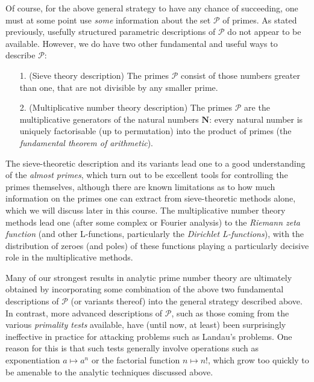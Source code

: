 \documentclass[10pt,reqno]{amsart}
\begin{document}
Of course, for the above general strategy to have any chance of succeeding, one must at some point use \emph{some} information about the set $\mathcal{P}$ of primes. As stated previously, usefully structured parametric descriptions of $\mathcal{P}$ do not appear to be available. However, we do have two other fundamental and useful ways to describe $\mathcal{P}$:
%
\begin{enumerate}
    \item[1.] (Sieve theory description) The primes $\mathcal{P}$ consist of those numbers greater than one, that are not divisible by any smaller prime.

    \item[2.] (Multiplicative number theory description) The primes $\mathcal{P}$ are the multiplicative generators of the natural numbers $\mathbf{N}$: every natural number is uniquely factorisable (up to permutation) into the product of primes (the \emph{fundamental theorem of arithmetic}).
\end{enumerate}
%
The sieve-theoretic description and its variants lead one to a good understanding of the \emph{almost primes}, which turn out to be excellent tools for controlling the primes themselves, although there are known limitations as to how much information on the primes one can extract from sieve-theoretic methods alone, which we will discuss later in this course. The multiplicative number theory methods lead one (after some complex or Fourier analysis) to the \emph{Riemann zeta function} (and other L-functions, particularly the \emph{Dirichlet L-functions}), with the distribution of zeroes (and poles) of these functions playing a particularly decisive role in the multiplicative methods.

Many of our strongest results in analytic prime number theory are ultimately obtained by incorporating some combination of the above two fundamental descriptions of $\mathcal{P}$ (or variants thereof) into the general strategy described above. In contrast, more advanced descriptions of $\mathcal{P}$, such as those coming from the various \emph{primality tests} available, have (until now, at least) been surprisingly ineffective in practice for attacking problems such as Landau’s problems. One reason for this is that such tests generally involve operations such as exponentiation $a \mapsto a^n$ or the factorial function $n \mapsto n!$, which grow too quickly to be amenable to the analytic techniques discussed above.
\end{document}

